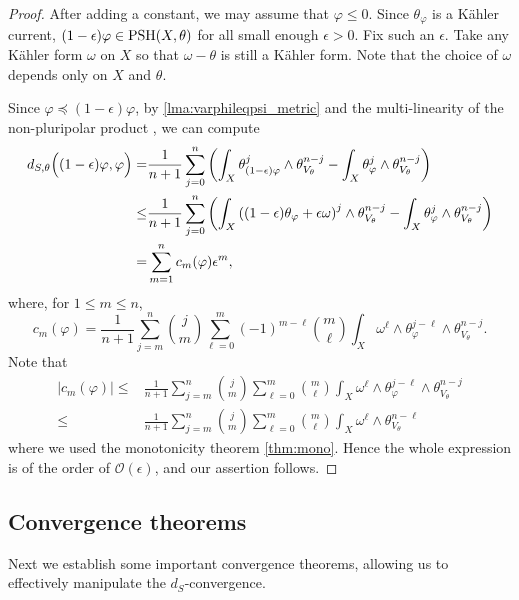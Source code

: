     \begin{proof}
        After adding a constant, we may assume that $\varphi\leq 0$. Since $\theta_{\varphi}$ is a Kähler current, $(1-\epsilon)\varphi\in \mathrm{PSH}(X,\theta)$ for all small enough $\epsilon>0$. Fix such an $\epsilon$. Take any Kähler form $\omega$ on $X$ so that $\omega-\theta$ is still a Kähler form. Note that the choice of $\omega$ depends only on $X$ and $\theta$.

        Since $\varphi\preceq (1-\epsilon)\varphi$, by \cref{lma:varphileqpsi_metric} and the multi-linearity of the non-pluripolar product , we can compute
        \[
        \begin{aligned}
            d_{S,\theta}\Bigl((1-\epsilon)\varphi,\varphi\Bigr)=& \frac{1}{n+1}\sum_{j=0}^n \left(\int_X \theta_{(1-\epsilon)\varphi}^j \wedge \theta_{V_{\theta}}^{n-j}-\int_X \theta_{\varphi}^j \wedge \theta_{V_{\theta}}^{n-j}\right)\\
            \leq & \frac{1}{n+1}\sum_{j=0}^n \left(\int_X \left((1-\epsilon)\theta_{\varphi}+\epsilon\omega\right)^j \wedge \theta_{V_{\theta}}^{n-j}-\int_X \theta_{\varphi}^j \wedge \theta_{V_{\theta}}^{n-j}\right)\\
            =&\sum_{m=1}^n c_m(\varphi)\epsilon^m,
        \end{aligned}
        \]
        where, for $1\leq m\leq n$,
        \[
            c_m(\varphi)=\frac{1}{n+1}\sum_{j=m}^n \binom{j}{m}
            \sum_{\ell=0}^m (-1)^{m-\ell}\binom{m}{\ell}
            \int_X \omega^\ell\wedge\theta_{\varphi}^{j-\ell}\wedge \theta_{V_{\theta}}^{n-j}.
        \]
        Note that
        \[
        \begin{aligned}
            \left|c_m(\varphi)\right| \leq & \frac{1}{n+1}\sum_{j=m}^n \binom{j}{m}
            \sum_{\ell=0}^m \binom{m}{\ell}
            \int_X \omega^\ell\wedge\theta_{\varphi}^{j-\ell}\wedge \theta_{V_{\theta}}^{n-j}\\
            \leq &  \frac{1}{n+1}\sum_{j=m}^n \binom{j}{m}
            \sum_{\ell=0}^m \binom{m}{\ell}
            \int_X \omega^\ell\wedge \theta_{V_{\theta}}^{n-\ell}
        \end{aligned}
        \]
        where we used the monotonicity theorem \cref{thm:mono}. Hence the whole expression is of the order of $\mathcal{O}(\epsilon)$, and our assertion follows.
    \end{proof}

\subsection{Convergence theorems}
\label{subsec:dS_conv}
Next we establish some important convergence theorems, allowing us to effectively manipulate the $d_S$-convergence.


